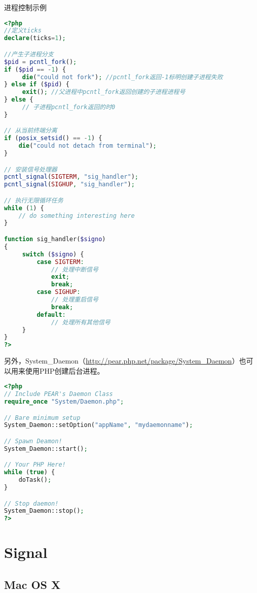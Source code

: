 \begin{example}
进程控制示例
\begin{lstlisting}[language=PHP]
<?php
//定义ticks
declare(ticks=1);

//产生子进程分支
$pid = pcntl_fork();
if ($pid == -1) {
     die("could not fork"); //pcntl_fork返回-1标明创建子进程失败
} else if ($pid) {
     exit(); //父进程中pcntl_fork返回创建的子进程进程号
} else {
     // 子进程pcntl_fork返回的时0
}

// 从当前终端分离
if (posix_setsid() == -1) {
    die("could not detach from terminal");
}

// 安装信号处理器
pcntl_signal(SIGTERM, "sig_handler");
pcntl_signal(SIGHUP, "sig_handler");

// 执行无限循环任务
while (1) {
    // do something interesting here
}

function sig_handler($signo) 
{
     switch ($signo) {
         case SIGTERM:
             // 处理中断信号
             exit;
             break;
         case SIGHUP:
             // 处理重启信号
             break;
         default:
             // 处理所有其他信号
     }
}
?>
\end{lstlisting}
\end{example}

另外，System\_Daemon（\url{http://pear.php.net/package/System_Daemon}）也可以用来使用PHP创建后台进程。


\begin{lstlisting}[language=PHP]
<?php
// Include PEAR's Daemon Class
require_once "System/Daemon.php";

// Bare minimum setup
System_Daemon::setOption("appName", "mydaemonname");

// Spawn Deamon!
System_Daemon::start();

// Your PHP Here!
while (true) {
    doTask();
}

// Stop daemon!
System_Daemon::stop();
?>
\end{lstlisting}



\section{Signal}



\subsection{Mac OS X}






